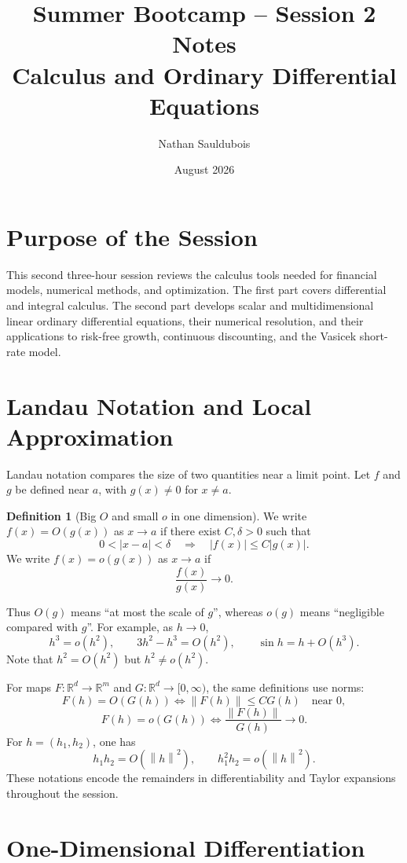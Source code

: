 \documentclass[11pt]{article}
\title{Summer Bootcamp -- Session 2 Notes\\Calculus and Ordinary Differential Equations}
\author{Nathan Sauldubois}
\date{August 2026}
\newcommand{\R}{\mathbb{R}}
\newcommand{\norm}[1]{\left\lVert #1\right\rVert}
\theoremstyle{definition}
\newtheorem{definition}{Definition}[section]
\theoremstyle{plain}
\theoremstyle{remark}
\begin{document}
\maketitle

\section*{Purpose of the Session}

This second three-hour session reviews the calculus tools needed for financial
models, numerical methods, and optimization. The first part covers differential
and integral calculus. The second part develops scalar and multidimensional
linear ordinary differential equations, their numerical resolution, and their
applications to risk-free growth, continuous discounting, and the Vasicek
short-rate model.

\section{Landau Notation and Local Approximation}

Landau notation compares the size of two quantities near a limit point. Let
$f$ and $g$ be defined near $a$, with $g(x)\neq0$ for $x\neq a$.

\begin{definition}[Big $O$ and small $o$ in one dimension]
We write $f(x)=O(g(x))$ as $x\to a$ if there exist $C,\delta>0$ such that
\[
0<|x-a|<\delta\quad\Longrightarrow\quad |f(x)|\leq C|g(x)|.
\]
We write $f(x)=o(g(x))$ as $x\to a$ if
\[
\frac{f(x)}{g(x)}\longrightarrow0.
\]
\end{definition}

Thus $O(g)$ means ``at most the scale of $g$'', whereas $o(g)$ means
``negligible compared with $g$''. For example, as $h\to0$,
\[
h^3=o(h^2),\qquad 3h^2-h^3=O(h^2),\qquad
\sin h=h+O(h^3).
\]
Note that $h^2=O(h^2)$ but $h^2\neq o(h^2)$.

For maps $F:\R^d\to\R^m$ and $G:\R^d\to[0,\infty)$, the same definitions
use norms:
\[
F(h)=O(G(h))\iff \norm{F(h)}\leq CG(h)\quad\text{near }0,
\]
\[
F(h)=o(G(h))\iff \frac{\norm{F(h)}}{G(h)}\longrightarrow0.
\]
For $h=(h_1,h_2)$, one has
\[
h_1h_2=O(\norm h^2),
\qquad h_1^2h_2=o(\norm h^2).
\]
These notations encode the remainders in differentiability and Taylor
expansions throughout the session.

\section{One-Dimensional Differentiation}
\end{document}
